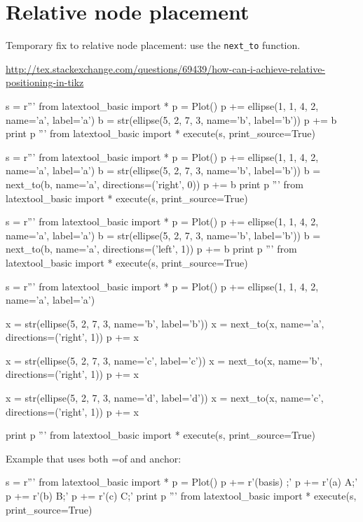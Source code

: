 \section{Relative node placement}

Temporary fix to relative node placement: use the \verb!next_to! function.


\url{http://tex.stackexchange.com/questions/69439/how-can-i-achieve-relative-positioning-in-tikz}

\begin{python}
s = r'''
from latextool_basic import *
p = Plot()
p += ellipse(1, 1, 4, 2, name='a', label='a')
b = str(ellipse(5, 2, 7, 3, name='b', label='b'))
p += b
print p
'''
from latextool_basic import *
execute(s, print_source=True)
\end{python}

\begin{python}
s = r'''
from latextool_basic import *
p = Plot()
p += ellipse(1, 1, 4, 2, name='a', label='a')
b = str(ellipse(5, 2, 7, 3, name='b', label='b'))
b = next_to(b, name='a', directions=('right', 0))
p += b
print p
'''
from latextool_basic import *
execute(s, print_source=True)
\end{python}

\begin{python}
s = r'''
from latextool_basic import *
p = Plot()
p += ellipse(1, 1, 4, 2, name='a', label='a')
b = str(ellipse(5, 2, 7, 3, name='b', label='b'))
b = next_to(b, name='a', directions=('left', 1))
p += b
print p
'''
from latextool_basic import *
execute(s, print_source=True)
\end{python}

\begin{python}
s = r'''
from latextool_basic import *
p = Plot()
p += ellipse(1, 1, 4, 2, name='a', label='a')

x = str(ellipse(5, 2, 7, 3, name='b', label='b'))
x = next_to(x, name='a', directions=('right', 1))
p += x

x = str(ellipse(5, 2, 7, 3, name='c', label='c'))
x = next_to(x, name='b', directions=('right', 1))
p += x

x = str(ellipse(5, 2, 7, 3, name='d', label='d'))
x = next_to(x, name='c', directions=('right', 1))
p += x

print p
'''
from latextool_basic import *
execute(s, print_source=True)
\end{python}



\newpage
Example that uses both =of and anchor:
\begin{python}
s = r'''
from latextool_basic import *
p = Plot()
p += r'\node[minimum width=5cm, draw, rectangle] (basis) {};'
p += r'\node[above=of basis.north west, anchor=south west, draw, rectangle, minimum width=1cm] (a) {A};'
p += r'\node[above=of basis, draw, rectangle,minimum width=1cm] (b) {B};'
p += r'\node[above=of basis.north east, anchor=south east, draw, rectangle, minimum width=1cm] (c) {C};'
print p
'''
from latextool_basic import *
execute(s, print_source=True)
\end{python}

